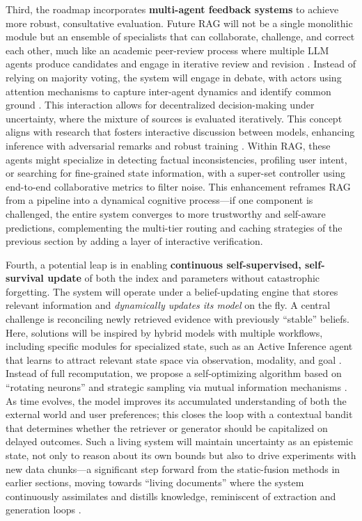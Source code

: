 \documentclass[11pt]{article}
\begin{document}
Third, the roadmap incorporates \textbf{multi-agent feedback systems} to achieve more robust, consultative evaluation. Future RAG will not be a single monolithic module but an ensemble of specialists that can collaborate, challenge, and correct each other, much like an academic peer-review process where multiple LLM agents produce candidates and engage in iterative review and revision \cite{ref469}. Instead of relying on majority voting, the system will engage in debate, with actors using attention mechanisms to capture inter-agent dynamics and identify common ground \cite{ref470,ref471}. This interaction allows for decentralized decision-making under uncertainty, where the mixture of sources is evaluated iteratively. This concept aligns with research that fosters interactive discussion between models, enhancing inference with adversarial remarks and robust training \cite{ref472}. Within RAG, these agents might specialize in detecting factual inconsistencies, profiling user intent, or searching for fine-grained state information, with a super-set controller using end-to-end collaborative metrics to filter noise. This enhancement reframes RAG from a pipeline into a dynamical cognitive process---if one component is challenged, the entire system converges to more trustworthy and self-aware predictions, complementing the multi-tier routing and caching strategies of the previous section by adding a layer of interactive verification.

Fourth, a potential leap is in enabling \textbf{continuous self-supervised, self-survival update} of both the index and parameters without catastrophic forgetting. The system will operate under a belief-updating engine that stores relevant information and \emph{dynamically updates its model} on the fly. A central challenge is reconciling newly retrieved evidence with previously ``stable'' beliefs. Here, solutions will be inspired by hybrid models with multiple workflows, including specific modules for specialized state, such as an Active Inference agent that learns to attract relevant state space via observation, modality, and goal \cite{ref473,ref474}. Instead of full recomputation, we propose a self-optimizing algorithm based on ``rotating neurons'' and strategic sampling via mutual information mechanisms \cite{ref475}. As time evolves, the model improves its accumulated understanding of both the external world and user preferences; this closes the loop with a contextual bandit that determines whether the retriever or generator should be capitalized on delayed outcomes. Such a living system will maintain uncertainty as an epistemic state, not only to reason about its own bounds but also to drive experiments with new data chunks---a significant step forward from the static-fusion methods in earlier sections, moving towards ``living documents'' where the system continuously assimilates and distills knowledge, reminiscent of extraction and generation loops \cite{ref476}.
\end{document}
